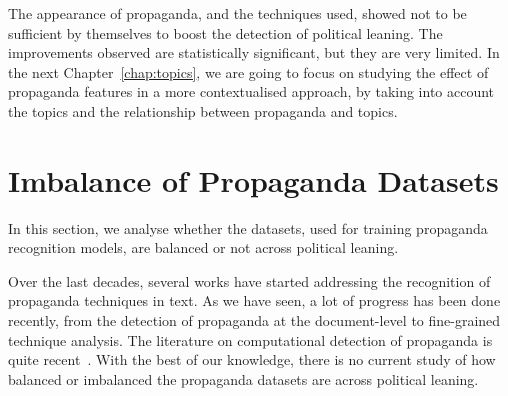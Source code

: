 The appearance of propaganda, and the techniques used, showed not to be sufficient by themselves to boost the detection of political leaning.
The improvements observed are statistically significant, but they are very limited.
In the next Chapter~\ref{chap:topics}, we are going to focus on studying the effect of propaganda features in a more contextualised approach, by taking into account the topics and the relationship between propaganda and topics.








\section{\statusgreen Imbalance of Propaganda Datasets}
\label{ssec:ps_prop_leaning_imbalanced}


In this section, we analyse whether the datasets, used for training propaganda recognition models, are balanced or not across political leaning.




Over the last decades, several works have started addressing the recognition of propaganda techniques in text. As we have seen, a lot of progress has been done recently, from the detection of propaganda at the document-level to fine-grained technique analysis. The literature on computational detection of propaganda is quite recent~\citep{da2020survey}.
With the best of our knowledge, there is no current study of how balanced or imbalanced the propaganda datasets are across political leaning.




